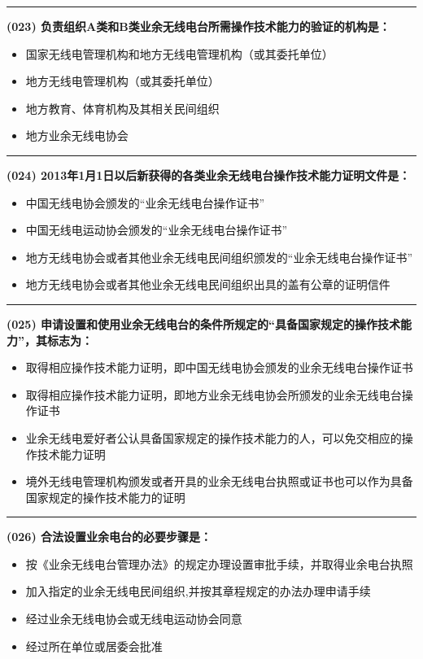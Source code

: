 \documentclass[twocolumn]{ctexart}  %
\begin{document}
\noindent\rule{0.5\textwidth}{1pt}
\heiti \textbf{(023) 负责组织A类和B类业余无线电台所需操作技术能力的验证的机构是：} \songti {\color{gray} [LK0020] }
\begin{itemize}
	\item  国家无线电管理机构和地方无线电管理机构（或其委托单位）
	\item  地方无线电管理机构（或其委托单位）
	\item  地方教育、体育机构及其相关民间组织
	\item  地方业余无线电协会
\end{itemize}


\noindent\rule{0.5\textwidth}{1pt}
\heiti \textbf{(024) 2013年1月1日以后新获得的各类业余无线电台操作技术能力证明文件是：} \songti {\color{gray} [LK0022] }
\begin{itemize}
	\item  中国无线电协会颁发的“业余无线电台操作证书”
	\item  中国无线电运动协会颁发的“业余无线电台操作证书”
	\item  地方无线电协会或者其他业余无线电民间组织颁发的“业余无线电台操作证书”
	\item  地方无线电协会或者其他业余无线电民间组织出具的盖有公章的证明信件
\end{itemize}


\noindent\rule{0.5\textwidth}{1pt}
\heiti \textbf{(025) 申请设置和使用业余无线电台的条件所规定的“具备国家规定的操作技术能力”，其标志为：} \songti {\color{gray} [LK0043] }
\begin{itemize}
	\item  取得相应操作技术能力证明，即中国无线电协会颁发的业余无线电台操作证书
	\item  取得相应操作技术能力证明，即地方业余无线电协会所颁发的业余无线电台操作证书
	\item  业余无线电爱好者公认具备国家规定的操作技术能力的人，可以免交相应的操作技术能力证明
	\item  境外无线电管理机构颁发或者开具的业余无线电台执照或证书也可以作为具备国家规定的操作技术能力的证明
\end{itemize}


\noindent\rule{0.5\textwidth}{1pt}
\heiti \textbf{(026) 合法设置业余电台的必要步骤是：} \songti {\color{gray} [LK0006] }
\begin{itemize}
	\item  按《业余无线电台管理办法》的规定办理设置审批手续，并取得业余电台执照
	\item  加入指定的业余无线电民间组织,并按其章程规定的办法办理申请手续
	\item  经过业余无线电协会或无线电运动协会同意
	\item  经过所在单位或居委会批准
\end{itemize}
\end{document}
